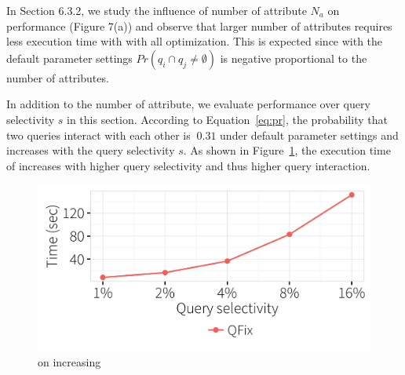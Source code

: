 In Section 6.3.2, we study the influence of number of attribute $N_a$ on \sys performance (Figure 7(a)) and observe that larger number of attributes requires less execution time with \sys with all optimization. This is expected since with the default parameter settings $Pr(q_i\cap q_j \neq \emptyset)$ is negative proportional to the number of attributes.

In addition to the number of attribute, we evaluate \sys performance over query selectivity $s$ in this section. According to Equation~\ref{eq:pr},  the probability that two queries interact with each other is $~0.31$ under default parameter settings and increases with the query selectivity $s$. As shown in Figure~\ref{f:selectivityvstime}, the execution time of \sys increases with higher query selectivity and thus higher query interaction. 

\begin{figure}[thb]
\centering
  \includegraphics[width = \columnwidth]{figures/rangevstime}
 \caption{\sys on increasing }
  \label{f:selectivityvstime} 
\end{figure}

\pagebreak